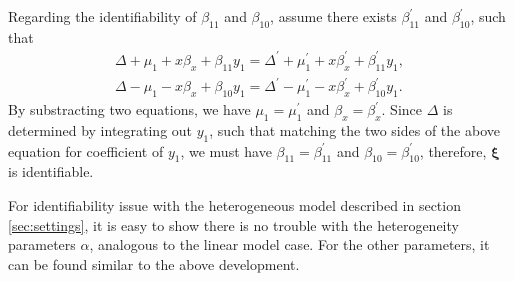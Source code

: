 \documentclass[12pt]{article}
\begin{document}
Regarding the identifiability of $\beta_{11}$ and $\beta_{10}$,
assume there exists $\beta_{11}^{'}$ and $\beta_{10}^{'}$, such that
\begin{align*}
  \Delta + \mu_1 + x\beta_x + \beta_{11}y_1 = \Delta^{'} + \mu_1^{'} + x\beta_{x}^{'} + \beta_{11}^{'}y_1, \\
  \Delta - \mu_1 - x\beta_x + \beta_{10}y_1 = \Delta^{'} - \mu_1^{'} -
  x\beta_{x}^{'} + \beta_{10}^{'}y_1.
\end{align*}
By substracting two equations, we have $\mu_1 = \mu_1^{'}$ and
$\beta_x = \beta_x^{'}$. Since $\Delta$ is determined by integrating
out $y_1$, such that matching the two sides of the above equation for
coefficient of $y_1$, we must have $\beta_{11} = \beta_{11}^{'}$ and
$\beta_{10} = \beta_{10}^{'}$, therefore, $\bm \xi$ is identifiable.

For identifiability issue with the heterogeneous model described in
section \ref{sec:settings}, it is easy to show there is no trouble
with the heterogeneity parameters $\alpha$, analogous to the linear
model case. For the other parameters, it can be found similar to the
above development.
\end{document}
